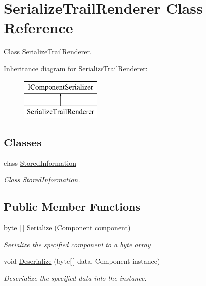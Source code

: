 \hypertarget{class_serialize_trail_renderer}{}\section{Serialize\+Trail\+Renderer Class Reference}
\label{class_serialize_trail_renderer}


Class \hyperlink{class_serialize_trail_renderer}{Serialize\+Trail\+Renderer}.  


Inheritance diagram for Serialize\+Trail\+Renderer\+:\begin{figure}[H]
\begin{center}
\leavevmode
\includegraphics[height=2.000000cm]{class_serialize_trail_renderer}
\end{center}
\end{figure}
\subsection*{Classes}
\begin{DoxyCompactItemize}
\item 
class \hyperlink{class_serialize_trail_renderer_1_1_stored_information}{Stored\+Information}
\begin{DoxyCompactList}\small\item\em Class \hyperlink{class_serialize_trail_renderer_1_1_stored_information}{Stored\+Information}. \end{DoxyCompactList}\end{DoxyCompactItemize}
\subsection*{Public Member Functions}
\begin{DoxyCompactItemize}
\item 
byte \mbox{[}$\,$\mbox{]} \hyperlink{class_serialize_trail_renderer_ab7177e5b5343bff3444f014b3a1f88de}{Serialize} (Component component)
\begin{DoxyCompactList}\small\item\em Serialize the specified component to a byte array \end{DoxyCompactList}\item 
void \hyperlink{class_serialize_trail_renderer_a9be87b05372daa6150e8e4522fa97568}{Deserialize} (byte\mbox{[}$\,$\mbox{]} data, Component instance)
\begin{DoxyCompactList}\small\item\em Deserialize the specified data into the instance. \end{DoxyCompactList}\end{DoxyCompactItemize}
